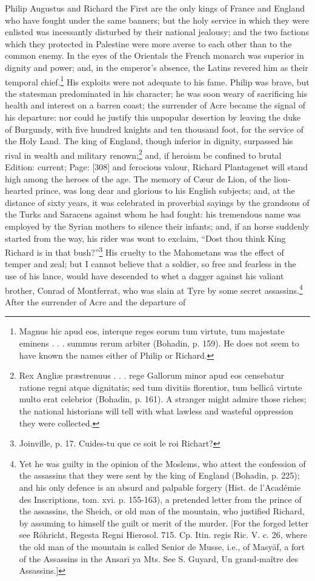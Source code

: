 Philip Augustus and Richard the First are the only kings of France and England who have fought under the same banners; but the holy service in which they were enlisted was incessantly disturbed by their national jealousy; and the two factions which they protected in Palestine were more averse to each other than to the common enemy. In the eyes of the Orientals the French monarch was superior in dignity and power; and, in the emperor\texthebrew{}’s absence, the Latins revered him as their temporal chief.\footnote{Magnus hic apud eos, interque reges eorum tum virtute, tum majestate eminens . . . summus rerum arbiter (Bohadin, p. 159). He does not seem to have known the names either of Philip or Richard.} His exploits were not adequate to his fame. Philip was brave, but the statesman predominated in his character; he was soon weary of sacrificing his health and interest on a barren coast; the surrender of Acre became the signal of his departure: nor could he justify this unpopular desertion by leaving the duke of Burgundy, with five hundred knights and ten thousand foot, for the service of the Holy Land. The king of England, though inferior in dignity, surpassed his rival in wealth and military renown;\footnote{Rex Angliæ præstrenuus . . . rege Gallorum minor apud eos censebatur ratione regni atque dignitatis; sed tum divitiis florentior, tum bellicâ virtute multo erat celebrior (Bohadin, p. 161). A stranger might admire those riches; the national historians will tell with what lawless and wasteful oppression they were collected.} and, if heroism be confined to brutal Edition: current; Page: [308] and ferocious valour, Richard Plantagenet will stand high among the heroes of the age. The memory of Cæur de Lion, of the lion-hearted prince, was long dear and glorious to his English subjects; and, at the distance of sixty years, it was celebrated in proverbial sayings by the grandsons of the Turks and Saracens against whom he had fought: his tremendous name was employed by the Syrian mothers to silence their infants; and, if an horse suddenly started from the way, his rider was wont to exclaim, \texthebrew{“}Dost thou think King Richard is in that bush?\texthebrew{}”\footnote{Joinville, p. 17. Cuides-tu que ce soit le roi Richart?} His cruelty to the Mahometans was the effect of temper and zeal; but I cannot believe that a soldier, so free and fearless in the use of his lance, would have descended to whet a dagger against his valiant brother, Conrad of Montferrat, who was slain at Tyre by some secret assassins.\footnote{Yet he was guilty in the opinion of the Moslems, who attest the confession of the assassins that they were sent by the king of England (Bohadin, p. 225); and his only defence is an absurd and palpable forgery (Hist. de l\texthebrew{}’Académie des Inscriptions, tom. xvi. p. 155-163), a pretended letter from the prince of the assassins, the Sheich, or old man of the mountain, who justified Richard, by assuming to himself the guilt or merit of the murder. [For the forged letter see Röhricht, Regesta Regni Hierosol. 715. Cp. Itin. regis Ric. V. c. 26, where the old man of the mountain is called Senior de Musse, i.e., of Masyāf, a fort of the Assassins in the Ansarī ya Mts. See S. Guyard, Un grand-maître des Assassins.]} After the surrender of Acre and the departure of 